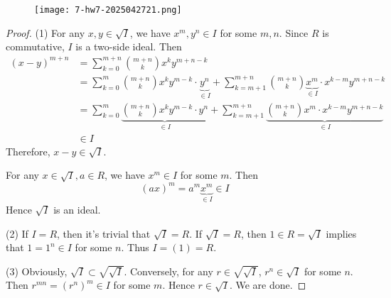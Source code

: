 \begin{exercise}
\begin{figure}[H]
\centering
\texttt{[image: 7-hw7-2025042721.png]}
\label{}
\end{figure}
\end{exercise}
\begin{proof}
(1)
For any $x, y\in \sqrt{ I }$, we have $x^{m}, y^{n}\in I$ for some $m,n$. Since $R$ is commutative, $I$ is a two-side ideal. Then
\[
\begin{aligned}
(x-y)^{m+n} & =\sum_{k=0}^{m+n} \binom{m+n}{k}x^{k}y^{m+n-k} \\
 & =\sum_{k=0}^{m} \binom{m+n}{k}x^{k}y^{m-k}\cdot\underbrace{  y^{n} }_{ \in I }+\sum_{k=m+1}^{m+n} \binom{m+n}{k}\underbrace{ x^{m} }_{ \in I }\cdot x^{k-m}y^{m+n-k}  \\
 & =\sum_{k=0}^{m} \underbrace{\binom{m+n}{k}x^{k}y^{m-k}\cdot  y^{n} }_{ \in I }+\sum_{k=m+1}^{m+n} \underbrace{\binom{m+n}{k} x^{m} \cdot x^{k-m}y^{m+n-k}}_{ \in I } \\
  & \in I
\end{aligned}
\]
Therefore, $x-y\in \sqrt{ I }$.

For any $x\in \sqrt{ I }, a\in R$, we have $x^{m}\in I$ for some $m$. Then
\[
(ax)^{m}=a^{m}\underbrace{ x^{m} }_{ \in I }\in I
\]
Hence $\sqrt{ I }$ is an ideal.

(2)
If $I=R$, then it's trivial that $\sqrt{ I }=R$. If $\sqrt{ I }=R$, then $1\in R=\sqrt{ I }$ implies that $1=1^{n}\in I$ for some $n$. Thus $I=(1)=R$.

(3)
Obviously, $\sqrt{ I }\subset \sqrt{ \sqrt{ I } }$. Conversely, for any $r\in \sqrt{ \sqrt{ I } }$, $r^{n}\in \sqrt{ I }$ for some $n$. Then $r^{mn}=(r^{n})^{m}\in I$ for some $m$. Hence $r\in \sqrt{ I }$. We are done.


\end{proof}

